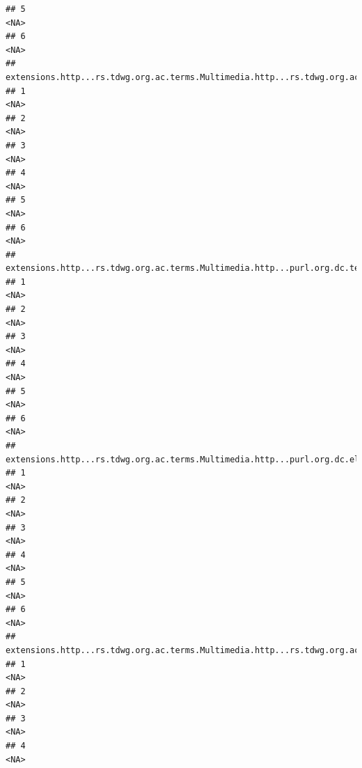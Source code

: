 \documentclass[
]{book}
\begin{document}
\begin{verbatim}
## 5                                                                                              <NA>
## 6                                                                                              <NA>
##   extensions.http...rs.tdwg.org.ac.terms.Multimedia.http...rs.tdwg.org.ac.terms.taxonCount.2
## 1                                                                                       <NA>
## 2                                                                                       <NA>
## 3                                                                                       <NA>
## 4                                                                                       <NA>
## 5                                                                                       <NA>
## 6                                                                                       <NA>
##   extensions.http...rs.tdwg.org.ac.terms.Multimedia.http...purl.org.dc.terms.creator.2
## 1                                                                                 <NA>
## 2                                                                                 <NA>
## 3                                                                                 <NA>
## 4                                                                                 <NA>
## 5                                                                                 <NA>
## 6                                                                                 <NA>
##   extensions.http...rs.tdwg.org.ac.terms.Multimedia.http...purl.org.dc.elements.1.1.rights.2
## 1                                                                                       <NA>
## 2                                                                                       <NA>
## 3                                                                                       <NA>
## 4                                                                                       <NA>
## 5                                                                                       <NA>
## 6                                                                                       <NA>
##   extensions.http...rs.tdwg.org.ac.terms.Multimedia.http...rs.tdwg.org.ac.terms.tag.2
## 1                                                                                <NA>
## 2                                                                                <NA>
## 3                                                                                <NA>
## 4                                                                                <NA>

\end{verbatim}
\end{document}
